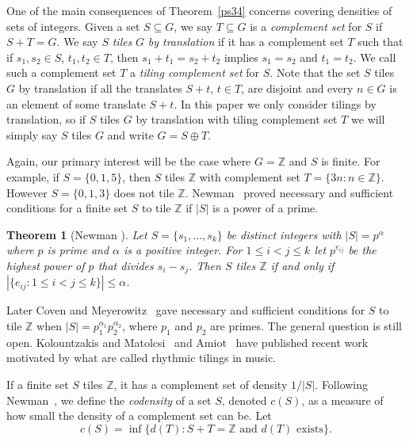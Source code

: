 \documentclass[12pt]{article}
\newtheorem{theorem}{Theorem}
\newcommand{\Z}{\ensuremath{\mathbb Z}}
\begin{document}
One of the main consequences of Theorem~\ref{ps34} concerns covering densities of sets of integers. Given a set $S \subseteq G$, we say $T\subseteq G$ is a \textit{complement set} for $S$ if $S+T = G$.  We say $S$ \textit{tiles} $G$ \textit{by translation} if it has a complement set $T$ such that if $s_1, s_2 \in S$, $t_1, t_2 \in T$, then $s_1 + t_1=s_2+t_2$ implies $s_1 = s_2$ and $t_1 = t_2$. We call such a complement set $T$ a \textit{tiling complement set} for $S$.  Note that the set $S$ tiles $G$ by translation if all the translates $S + t$, $t \in T$, are disjoint and every $n \in G$ is an element of some translate $S+t$. In this paper we only consider tilings by translation, so if $S$ tiles $G$ by translation with tiling complement set $T$ we will simply say $S$ tiles $G$ and write $G=S \oplus T$.

Again, our primary interest will be the case where $G= \Z$ and $S$ is finite. For example, if $S=\{0,1,5\}$, then $S$ tiles $\Z$ with complement set $T=\{3n:n\in \Z\}$. However $S=\{0,1,3\}$ does not tile $\Z$. Newman~\cite{New77} proved necessary and sufficient conditions for a finite set $S$ to tile $\Z$ if $|S|$ is a power of a prime. 

\begin{theorem}[Newman \cite{New77}]\label{newtile77}
Let $S=\{s_1, \ldots, s_k\}$ be distinct integers with $|S|=p^\alpha$ where $p$ is prime and $\alpha$ is a positive integer.  For $1\le i<j\le k$ let $p^{e_{ij}}$ be the highest power of $p$ that divides $s_i-s_j$.  Then $S$ tiles $\Z$ if and only if $|\{e_{ij}: 1 \le i <j \le k\}| \le \alpha$.
\end{theorem} 

Later Coven and Meyerowitz~\cite{CM99} gave necessary and sufficient conditions for $S$ to tile $\Z$ when $|S|= p_1^{\alpha_1}p_2^{\alpha_2}$, where $p_1$ and $p_2$ are primes. The general question is still open. Kolountzakis and Matolcsi~\cite{KM09} and Amiot~\cite{Ami16} have published recent work motivated by what are called rhythmic tilings in music.

If a finite set $S$ tiles $\Z$, it has a complement set of density $1/|S|$. Following Newman~\cite{New67}, we define the \textit{codensity} of a set $S$, denoted $c(S)$, as a measure of how small the density of a complement set can be. Let
\[c(S) = \inf\{d(T): S+T=\Z \text{ and $d(T)$ exists}\}.\]

 
\end{document}
